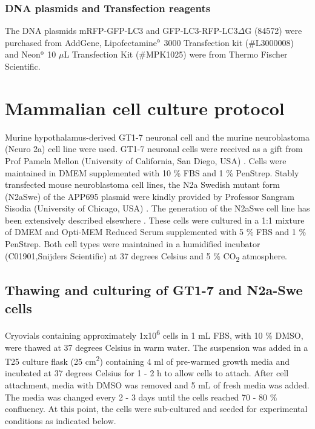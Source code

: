 \subsubsection{DNA plasmids and Transfection reagents}
The DNA plasmids mRFP-GFP-LC3 and GFP-LC3-RFP-LC3$\Delta$G (84572) were purchased from AddGene, Lipofectamine${\textsuperscript{\tiny{\textregistered}}}$ 3000 Transfection kit (\#L3000008) and Neon${\textsuperscript{\tiny{\textregistered}}}$ 10 $\mu$L Transfection Kit (\#MPK1025) were from Thermo Fischer Scientific.

\section{Mammalian cell culture protocol}
Murine hypothalamus-derived GT1-7 neuronal cell and the murine neuroblastoma (Neuro 2a) cell line were used. GT1-7 neuronal cells were received as a gift from Prof Pamela Mellon (University of California, San Diego, USA) \citep{Mellon1990}. Cells were maintained in DMEM supplemented with 10 \% FBS and 1 \% PenStrep. Stably transfected mouse neuroblastoma cell lines, the N2a Swedish mutant form (N2aSwe) of the APP695 plasmid were kindly provided by Professor Sangram Sisodia (University of Chicago, USA) \citep{Sisodia1990}. The generation of the N2aSwe cell line has been extensively described elsewhere \citep{Lo1994}. These cells were cultured in a 1:1 mixture of DMEM and Opti-MEM Reduced Serum supplemented with 5 \% FBS and 1 \% PenStrep. Both cell types were maintained in a humidified incubator (C01901,Snijders Scientific) at 37 degrees Celsius and 5 \% CO\textsubscript{2} atmosphere.

\subsection{Thawing and culturing of GT1-7 and N2a-Swe cells}
Cryovials containing approximately 1x10\textsuperscript{6} cells in 1 mL FBS, with 10 \% DMSO, were thawed at 37 degrees Celsius in warm water. The suspension was added in a T25 culture flask (25 cm\textsuperscript{2}) containing 4 ml of pre-warmed growth media and incubated at 37 degrees Celsius for 1 - 2 h to allow cells to attach. After cell attachment, media with DMSO was removed and 5 mL of fresh media was added. The media was changed every 2 - 3 days until the cells reached 70 - 80 \% confluency. At this point, the cells were sub-cultured and seeded for experimental conditions as indicated below.


